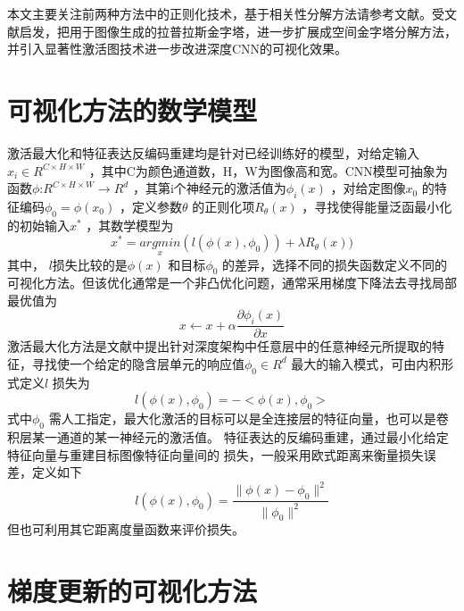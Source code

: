 本文主要关注前两种方法中的正则化技术，基于相关性分解方法请参考文献。受文献\citep{Huang2017c,Denton2015}启发，把用于图像生成的拉普拉斯金字塔，进一步扩展成空间金字塔分解方法，并引入显著性激活图技术进一步改进深度CNN的可视化效果。
\section{可视化方法的数学模型}

激活最大化和特征表达反编码重建均是针对已经训练好的模型，对给定输入$x_{i}\in R^{C\times H\times W}$ ，其中C为颜色通道数，H，W为图像高和宽。CNN模型可抽象为函数$\phi$:$R^{C\times H\times W}\rightarrow R^d$ ，其第i个神经元的激活值为$\phi _{i}(x)$ ，对给定图像$x_{0}$ 的特征编码$\phi _{0}=\phi (x_{0})$ ，定义参数$\theta$ 的正则化项$R_{\theta}(x)$ ，寻找使得能量泛函最小化的初始输入$x^*$ ，其数学模型为
\begin{equation} \label{eq:ch04_01}
     x^*=\underset{x}{argmin} (l(\phi (x),\phi _{0})) + \lambda R_\theta(x))
\end{equation}
其中， $l$损失比较的是$\phi (x)$ 和目标$\phi_{0}$ 的差异，选择不同的损失函数定义不同的可视化方法。但该优化通常是一个非凸优化问题，通常采用梯度下降法去寻找局部最优值为
\begin{equation} \label{eq:ch04_02}
     x \leftarrow x+ \alpha \frac{\partial \phi _{i}(x)}{\partial x}
\end{equation}
激活最大化方法是文献中提出针对深度架构中任意层中的任意神经元所提取的特征，寻找使一个给定的隐含层单元的响应值$\phi _{0}\in R^d$ 最大的输入模式，可由内积形式定义$l$ 损失为
\begin{equation} \label{eq:ch04_03}
     l(\phi (x),\phi_{0}) =-<\phi (x),\phi _{0}>
\end{equation}
  式中$\phi_{0}$ 需人工指定，最大化激活的目标可以是全连接层的特征向量，也可以是卷积层某一通道的某一神经元的激活值。
特征表达的反编码重建，通过最小化给定特征向量与重建目标图像特征向量间的 损失，一般采用欧式距离来衡量损失误差，定义如下 
\begin{equation} \label{eq:ch04_04}
     l(\phi (x),\phi _{0}) = \frac{\parallel\phi (x)-\phi _{0} \parallel^2 }{\parallel \phi _{0} \parallel^2 }
\end{equation} 
但也可利用其它距离度量函数来评价损失。

\section{梯度更新的可视化方法}
 
